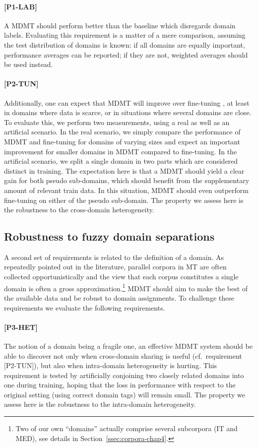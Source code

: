 \paragraph{[P1-LAB]} A MDMT should perform better than the baseline which disregards domain labels. Evaluating this requirement is a matter of a mere comparison, assuming the test distribution of domains is known: if all domains are equally important, performance averages can be reported; if they are not, weighted averages should be used instead.

\paragraph{[P2-TUN]} Additionally, one can expect that MDMT will improve over fine-tuning \citep{Luong15stanford,Freitag16fast}, at least in domains where data is scarce, or in situations where several domains are close. To evaluate this, we perform two measurements, using a real as well as an artificial scenario. In the real scenario, we simply compare the performance of MDMT and fine-tuning for domains of varying sizes and expect an important improvement for smaller domains in MDMT compared to fine-tuning. In the artificial scenario, we split a single domain in two parts which are considered distinct in training. The expectation here is that a MDMT should yield a clear gain for both pseudo sub-domains, which should benefit from the supplementary amount of relevant train data. In this situation, MDMT should even outperform fine-tuning on either of the pseudo sub-domain. The property we assess here is the robustness to the cross-domain heterogeneity.

\subsection{Robustness to fuzzy domain separations \label{ssec:robusness-chap4}}
A second set of requirements is related to the definition of a domain. As repeatedly pointed out in the literature, parallel corpora in MT are often collected opportunistically and the view that each corpus constitutes a single domain is often a gross approximation.\footnote{Two of our own ``domains'' actually comprise several subcorpora (IT and MED), see details in Section~\ref{ssec:corpora-chap4}.} MDMT should aim to make the best of the available data and be robust to domain assignments. To challenge these requirements we evaluate the following requirements.

\paragraph{[P3-HET]}
The notion of a domain being a fragile one, an effective MDMT system should be able to discover not only when cross-domain sharing is useful (cf.\ requirement [P2-TUN]), but also when intra-domain heterogeneity is hurting. This requirement is tested by artificially conjoining two closely related domains into one during training, hoping that the loss in performance with respect to the original setting (using correct domain tags) will remain small. The property we assess here is the robustness to the intra-domain heterogeneity.

